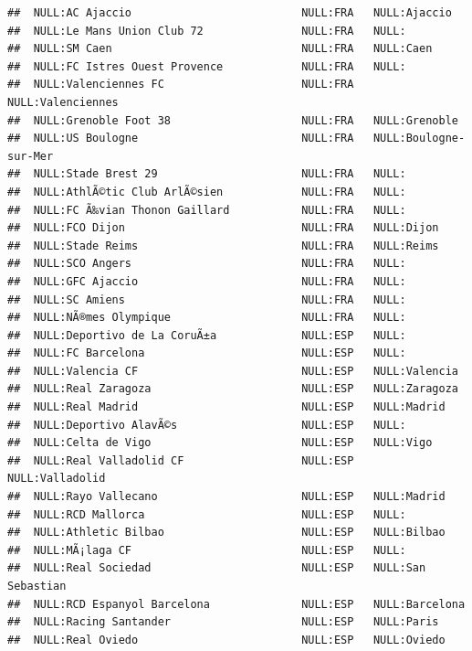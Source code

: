 \documentclass{article}\usepackage[]{graphicx}\usepackage[]{color}
\makeatletter
\newenvironment{kframe}{%
 \def\at@end@of@kframe{}%
 \ifinner\ifhmode%
  \def\at@end@of@kframe{\end{minipage}}%
  \begin{minipage}{\columnwidth}%
 \fi\fi%
 \def\FrameCommand##1{\hskip\@totalleftmargin \hskip-\fboxsep
 \colorbox{shadecolor}{##1}\hskip-\fboxsep
     \hskip-\linewidth \hskip-\@totalleftmargin \hskip\columnwidth}%
 \MakeFramed {\advance\hsize-\width
   \@totalleftmargin\z@ \linewidth\hsize
   \@setminipage}}%
 {\par\unskip\endMakeFramed%
 \at@end@of@kframe}
\newenvironment{knitrout}{}{} %
\makeatother
\begin{document}
\begin{knitrout}
\begin{kframe}
\begin{verbatim}
##  NULL:AC Ajaccio                          NULL:FRA   NULL:Ajaccio              
##  NULL:Le Mans Union Club 72               NULL:FRA   NULL:                     
##  NULL:SM Caen                             NULL:FRA   NULL:Caen                 
##  NULL:FC Istres Ouest Provence            NULL:FRA   NULL:                     
##  NULL:Valenciennes FC                     NULL:FRA   NULL:Valenciennes         
##  NULL:Grenoble Foot 38                    NULL:FRA   NULL:Grenoble             
##  NULL:US Boulogne                         NULL:FRA   NULL:Boulogne-sur-Mer     
##  NULL:Stade Brest 29                      NULL:FRA   NULL:                     
##  NULL:AthlÃ©tic Club ArlÃ©sien            NULL:FRA   NULL:                     
##  NULL:FC Ã‰vian Thonon Gaillard           NULL:FRA   NULL:                     
##  NULL:FCO Dijon                           NULL:FRA   NULL:Dijon                
##  NULL:Stade Reims                         NULL:FRA   NULL:Reims                
##  NULL:SCO Angers                          NULL:FRA   NULL:                     
##  NULL:GFC Ajaccio                         NULL:FRA   NULL:                     
##  NULL:SC Amiens                           NULL:FRA   NULL:                     
##  NULL:NÃ®mes Olympique                    NULL:FRA   NULL:                     
##  NULL:Deportivo de La CoruÃ±a             NULL:ESP   NULL:                     
##  NULL:FC Barcelona                        NULL:ESP   NULL:                     
##  NULL:Valencia CF                         NULL:ESP   NULL:Valencia             
##  NULL:Real Zaragoza                       NULL:ESP   NULL:Zaragoza             
##  NULL:Real Madrid                         NULL:ESP   NULL:Madrid               
##  NULL:Deportivo AlavÃ©s                   NULL:ESP   NULL:                     
##  NULL:Celta de Vigo                       NULL:ESP   NULL:Vigo                 
##  NULL:Real Valladolid CF                  NULL:ESP   NULL:Valladolid           
##  NULL:Rayo Vallecano                      NULL:ESP   NULL:Madrid               
##  NULL:RCD Mallorca                        NULL:ESP   NULL:                     
##  NULL:Athletic Bilbao                     NULL:ESP   NULL:Bilbao               
##  NULL:MÃ¡laga CF                          NULL:ESP   NULL:                     
##  NULL:Real Sociedad                       NULL:ESP   NULL:San Sebastian        
##  NULL:RCD Espanyol Barcelona              NULL:ESP   NULL:Barcelona            
##  NULL:Racing Santander                    NULL:ESP   NULL:Paris                
##  NULL:Real Oviedo                         NULL:ESP   NULL:Oviedo               

\end{verbatim}
\end{kframe}
\end{knitrout}
\end{document}
